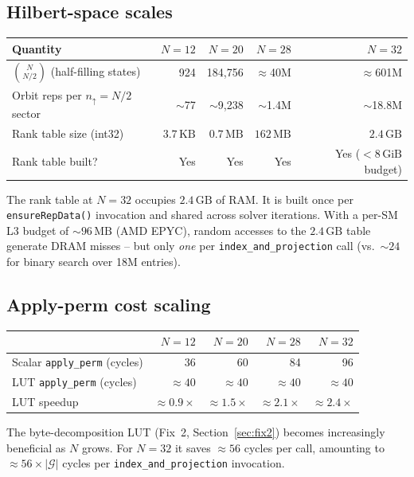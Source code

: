 \documentclass[11pt,a4paper]{article}
\begin{document}
\subsection{Hilbert-space scales}

\begin{center}
\begin{tabular}{@{}lrrrr@{}}
\toprule
Quantity & $N=12$ & $N=20$ & $N=28$ & $N=32$ \\
\midrule
$\binom{N}{N/2}$ (half-filling states) & 924 & 184,756 & $\approx$40M & $\approx$601M \\
Orbit reps per $n_\uparrow = N/2$ sector &
  $\sim$77 & $\sim$9,238 & $\sim$1.4M & $\sim$18.8M \\
Rank table size (int32) & $3.7\,\mathrm{KB}$ & $0.7\,\mathrm{MB}$ &
  $162\,\mathrm{MB}$ & $2.4\,\mathrm{GB}$ \\
Rank table built? & Yes & Yes & Yes & Yes ($< 8\,\mathrm{GiB}$ budget) \\
\bottomrule
\end{tabular}
\end{center}

The rank table at $N=32$ occupies $2.4\,\mathrm{GB}$ of RAM.  It is built once
per \texttt{ensureRepData()} invocation and shared across solver iterations.
With a per-SM L3 budget of $\sim 96\,\mathrm{MB}$ (AMD EPYC), random accesses
to the $2.4\,\mathrm{GB}$ table generate DRAM misses -- but only \emph{one} per
\texttt{index\_and\_projection} call (vs.\ $\sim 24$ for binary search over
18M entries).

\subsection{Apply-perm cost scaling}

\begin{center}
\begin{tabular}{@{}lrrrr@{}}
\toprule
 & $N=12$ & $N=20$ & $N=28$ & $N=32$ \\
\midrule
Scalar \texttt{apply\_perm} (cycles) & 36 & 60 & 84 & 96 \\
LUT \texttt{apply\_perm} (cycles) & $\approx40$ & $\approx40$ & $\approx40$ & $\approx40$ \\
LUT speedup & $\approx0.9\times$ & $\approx1.5\times$ & $\approx2.1\times$ & $\approx2.4\times$ \\
\bottomrule
\end{tabular}
\end{center}

The byte-decomposition LUT (Fix~2, Section~\ref{sec:fix2}) becomes increasingly
beneficial as $N$ grows.  For $N=32$ it saves $\approx 56$ cycles per call,
amounting to $\approx 56 \times |\mathcal{G}|$ cycles per
\texttt{index\_and\_projection} invocation.
\end{document}
